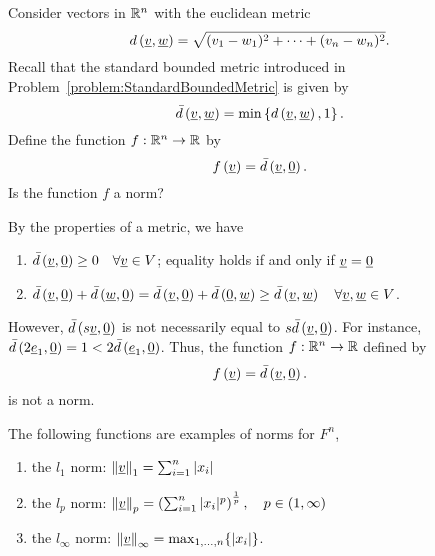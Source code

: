 \begin{example}
Consider vectors in $\mathbb{R}^n$ with the euclidean metric
\begin{equation*}
d \left( \underline{v}, \underline{w} \right)
= \sqrt{ (v_1 - w_1)^2 + \cdots + (v_n - w_n)^2 }.
\end{equation*}
Recall that the standard bounded metric introduced in Problem~\ref{problem:StandardBoundedMetric} is given by
\begin{equation*}
\bar{d} \left( \underline{v}, \underline{w} \right)
= \min \left\{ d \left( \underline{v}, \underline{w} \right), 1 \right\}.
\end{equation*}
Define the function $f : \mathbb{R}^n \rightarrow \mathbb{R}$ by
\begin{equation*}
f \left( \underline{v} \right) = \bar{d} \left( \underline{v}, \underline{0} \right).
\end{equation*}
Is the function $f$ a norm?

By the properties of a metric, we have
\begin{enumerate}
\item $\bar{d} \left( \underline{v}, \underline{0} \right) \geq 0 \quad \forall \underline{v} \in V$; equality holds if and only if $\underline{v} = \underline{0}$
\item $\bar{d} \left( \underline{v}, \underline{0} \right) + \bar{d} \left( \underline{w}, \underline{0} \right) = \bar{d} \left( \underline{v}, \underline{0} \right) + \bar{d} \left( \underline{0}, \underline{w} \right) \geq \bar{d} \left( \underline{v}, \underline{w} \right) \quad \forall \underline{v}, \underline{w} \in V$.
\end{enumerate}
However, $\bar{d} \left( s \underline{v}, \underline{0} \right)$ is not necessarily equal to $s \bar{d} \left( \underline{v}, \underline{0} \right)$.
For instance,
$\bar{d} \left( 2 \underline{e}_1, \underline{0} \right) = 1 < 2 \bar{d} \left( \underline{e}_1, \underline{0} \right)$.
Thus, the function $f : \mathbb{R}^n \rightarrow \mathbb{R}$ defined by
\begin{equation*}
f \left( \underline{v} \right) = \bar{d} \left( \underline{v}, \underline{0} \right).
\end{equation*}
is not a norm.
\end{example}

\begin{example}
The following functions are examples of norms for $F^n$,
\begin{enumerate}
\item the $l_1$ norm: $\left\| \underline{v} \right\|_1 = \sum_{i=1}^n |x_i|$
\item the $l_p$ norm: $\left\| \underline{v} \right\|_p = \left( \sum_{i=1}^n |x_i|^p \right)^{\frac{1}{p}}, \quad p \in (1,\infty)$
\item the $l_{\infty}$ norm: $\left\| \underline{v} \right\|_{\infty} = \max_{1,\ldots, n} \{ |x_i| \}$.
\end{enumerate}
\end{example}

